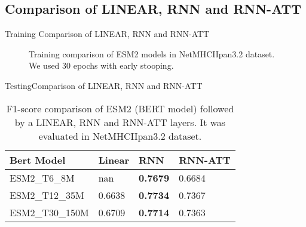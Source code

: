 \documentclass[10pt]{beamer}
\newcommand{\1}{
	\setbeamertemplate{background}{
		\texttt{[image: img/1]}
		\tikz[overlay] \fill[fill opacity=0.75,fill=white] (0,0) rectangle (-\paperwidth,\paperheight);
	}
}
\begin{document}


\subsection{Comparison of LINEAR, RNN and RNN-ATT}


\begin{frame}{Training}{ Comparison of LINEAR, RNN and RNN-ATT}
	
	\begin{figure}
		\centering     %
		\caption{Training comparison of ESM2 models in NetMHCIIpan3.2 dataset. We used 30 epochs with early stooping.}
	\end{figure}

	
\end{frame}


\begin{frame}{Testing}{Comparison of LINEAR, RNN and RNN-ATT}
	
	\begin{table}[]
		\centering
		\caption{F1-score comparison of ESM2 (BERT model) followed by a LINEAR, RNN and RNN-ATT layers. It was evaluated in NetMHCIIpan3.2 dataset.}
		\setlength{\tabcolsep}{0.8em} %
		{\renewcommand{\arraystretch}{1.3}%
			
		\begin{tabular}{llll}
			Bert Model           & Linear & RNN             & RNN-ATT \\ \hline
			ESM2\_T6\_8M    & nan    & \textbf{0.7679} & 0.6684  \\
			ESM2\_T12\_35M  & 0.6638 & \textbf{0.7734} & 0.7367  \\
			ESM2\_T30\_150M & 0.6709 & \textbf{0.7714} & 0.7363 
		\end{tabular}
	}
	\end{table}
	
\end{frame}
\end{document}
